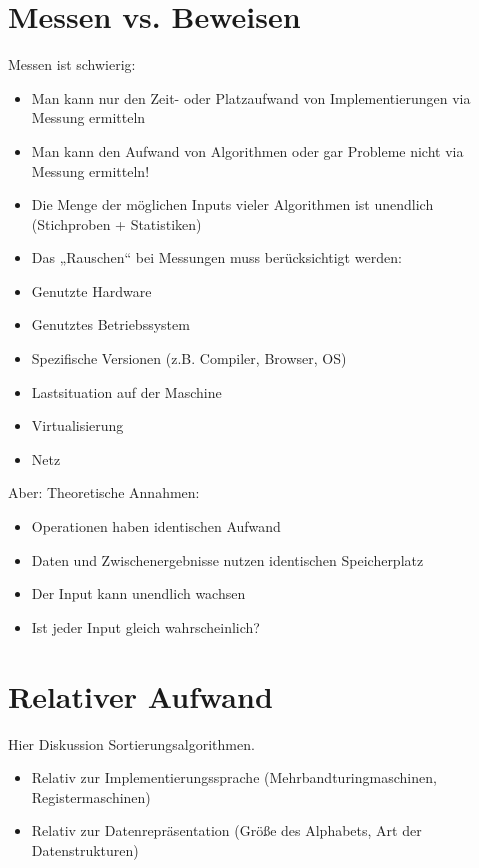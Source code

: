 
\section{Messen vs. Beweisen}\label{messenVsBeweisen}

Messen ist schwierig:
\begin{itemize}
  \item Man kann nur den Zeit- oder Platzaufwand von Implementierungen via Messung ermitteln
  \item Man kann den Aufwand von Algorithmen oder gar Probleme nicht via Messung ermitteln!
  \item Die Menge der möglichen Inputs vieler Algorithmen ist unendlich (Stichproben + Statistiken)
  \item Das „Rauschen“ bei Messungen muss berücksichtigt werden:
  \item Genutzte Hardware
  \item Genutztes Betriebssystem
  \item Spezifische Versionen (z.B. Compiler, Browser, OS)
  \item Lastsituation auf der Maschine
  \item Virtualisierung
  \item Netz
\end{itemize}

Aber: Theoretische Annahmen:
\begin{itemize}
  \item Operationen haben identischen Aufwand
  \item Daten und Zwischenergebnisse nutzen identischen Speicherplatz
  \item Der Input kann unendlich wachsen
  \item Ist jeder Input gleich wahrscheinlich?
\end{itemize}

\section{Relativer Aufwand}
Hier Diskussion Sortierungsalgorithmen.
\begin{itemize}
    \item Relativ zur Implementierungssprache (Mehrbandturingmaschinen, Registermaschinen)
    \item Relativ zur Datenrepräsentation (Größe des Alphabets, Art der Datenstrukturen)
\end{itemize}
